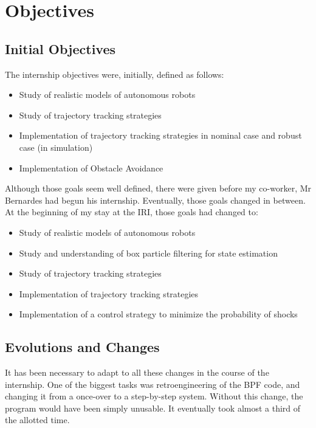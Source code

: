 \chapter{Objectives}

\label{theme}


\section{Initial Objectives}

The internship objectives were, initially, defined as follows:
\begin{itemize}
  \item Study of realistic models of autonomous robots
  \item Study of trajectory tracking strategies
  \item Implementation of trajectory tracking strategies in nominal case and robust case (in simulation)
  \item Implementation of Obstacle Avoidance
\end{itemize}

Although those goals seem well defined, there were given before my co-worker, Mr Bernardes had begun his internship.
Eventually, those goals changed in between.
At the beginning of my stay at the IRI, those goals had changed to:

\begin{itemize}
  \item Study of realistic models of autonomous robots
  \item Study and understanding of box particle filtering for state estimation
  \item Study of trajectory tracking strategies
  \item Implementation of trajectory tracking strategies
  \item Implementation of a control strategy to minimize the probability of shocks
\end{itemize}

\section{Evolutions and Changes}

It has been necessary to adapt to all these changes in the course of the internship.
 One of the biggest tasks was retroengineering of the BPF code, and changing it from a once-over to a step-by-step system.
Without this change, the program would have been simply unusable. It eventually took almost a third of the allotted time.\\

